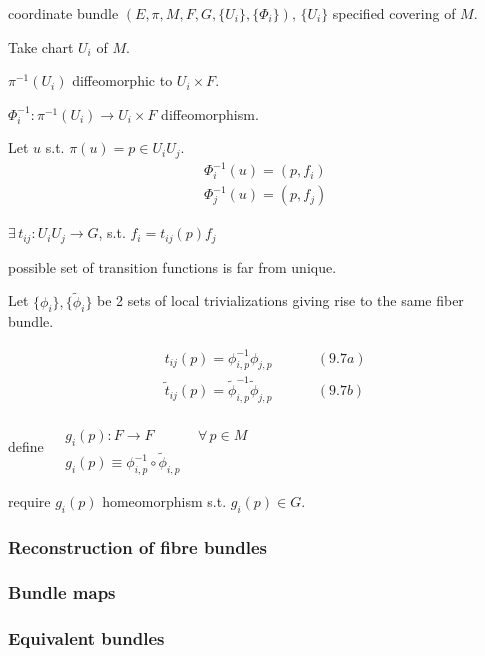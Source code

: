 \documentclass[twoside]{amsart}
\begin{document}
coordinate bundle $(E, \pi, M , F, G, \lbrace U_i \rbrace, \lbrace \Phi_i \rbrace)$, $\lbrace U_i \rbrace$ specified covering of $M$.  

Take chart $U_i$ of $M$.  

$\pi^{-1}(U_i)$ diffeomorphic to $U_i \times F$.  

$\Phi_i^{-1} : \pi^{-1}(U_i) \to U_i \times F$ diffeomorphism.  

Let $u$ s.t. $\pi(u) = p \in U_i U_j$.  
\[
\begin{aligned}
  & \Phi_i^{-1}(u) = ( p , f_i ) \\ 
  & \Phi_j^{-1}(u) = ( p , f_j )
\end{aligned}
\]

$\exists \, t_{ij} : U_i U_j \to G$, s.t. $f_i = t_{ij}(p) f_j$


possible set of transition functions is far from unique.  

Let $\lbrace \phi_i \rbrace, \lbrace \widetilde{\phi}_i \rbrace$ be 2 sets of local trivializations giving rise to the same fiber bundle.  

\[
\begin{aligned}
  & t_{ij}(p) = \phi^{-1}_{i,p} \phi_{j,p}  \quad \quad \quad \, (9.7a) \\ 
  & \widetilde{t}_{ij}(p) = \widetilde{\phi}^{-1}_{i,p} \widetilde{\phi}_{j,p} \quad \quad \quad \, (9.7b)
\end{aligned}
\]

define $\begin{aligned} & \quad \quad \\ 
  & g_i(p) : F \to F \quad \quad \quad \, \forall \, p \in M \\ 
  & g_i(p) \equiv \phi^{-1}_{i,p} \circ \widetilde{\phi}_{i,p} \end{aligned}$

require $g_i(p)$ homeomorphism s.t. $g_i(p) \in G$.  



\subsubsection{ Reconstruction of fibre bundles }


\subsubsection{ Bundle maps }


\subsubsection{ Equivalent bundles }
\end{document}
